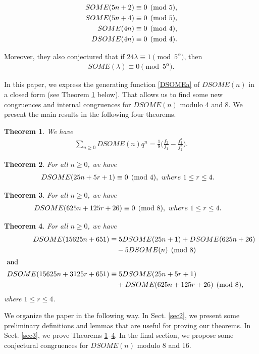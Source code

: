 \documentclass[12pt]{amsart}
\newtheorem{theorem}{Theorem}[section]
\theoremstyle{definition}
\numberwithin{equation}{section}
\begin{document}
 \begin{align}
  SOME(5n+2)&\equiv 0\pmod{5},\notag\\
 SOME(5n+4)&\equiv 0\pmod{5},\notag\\
 SOME(4n)&\equiv 0\pmod{4},\notag\\
 DSOME(4n)&\equiv 0\pmod{4}.\notag
       \end{align}
    \par Moreover, they also conjectured that if $24\lambda\equiv1\pmod{5^\alpha}$, then
\begin{align*}
    SOME(\lambda)\equiv0\pmod{5^\alpha}.
\end{align*}
\par
In this paper, we express the generating function \eqref{DSOMEa} of $DSOME(n)$ in a closed form (see Theorem \ref{Theorem1.1} below). That allows us to find some new congruences and internal congruences for $DSOME(n)$ modulo 4 and 8. We present the main results in the following four theorems.

 \begin{theorem}\label{Theorem1.1}We have
 \begin{align}   \sum_{n\geq0}DSOME(n)q^n=\frac{1}{8}\bigg(\frac{f_2}{f_1}-\frac{f_1^7}{f_2^3}\bigg)\label{DSOMEgf}.
 \end{align} 
 \end{theorem}
\begin{theorem}\label{Theorem1.2}
For all $n\geq0$, we have
\begin{align}
DSOME(25n+5r+1)&\equiv0\pmod{4}, ~where~  1\leq r\leq4.\notag
\end{align}
\end{theorem} 
\begin{theorem}\label{Theorem1.3}
    For all $n\geq0$, we have
    \begin{align} DSOME(625n+125r+26)&\equiv0\pmod{8},~where~  1\leq r\leq4.\notag
\end{align}
\end{theorem}
\begin{theorem}\label{Theorem1.4}{For all $n\geq0$, we have}
      \begin{align*} DSOME(15625n+651)&\equiv 5DSOME(25n+1)+DSOME(625n+26)\\
  &\quad-5DSOME(n)\pmod{8}\\\intertext{and}
 DSOME(15625n+3125r+651)&\equiv 5DSOME(25n+5r+1)\\
&\quad+DSOME(625n+125r+26)\pmod{8},
\end{align*}
where  $1\leq r\leq4$.
\end{theorem}
We organize the paper in the following way. In Sect. \ref{sec2}, we present some preliminary definitions and lemmas that are useful for proving our theorems. In Sect. \ref{sec3}, we prove Theorems \ref{Theorem1.1}--\ref{Theorem1.4}. In the final section, we propose some conjectural congruences for $DSOME(n)$ modulo 8 and 16.
\end{document}
